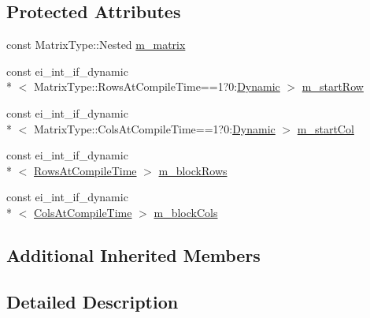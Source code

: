 \subsection*{Protected Attributes}
\begin{DoxyCompactItemize}
\item 
const Matrix\-Type\-::\-Nested \hyperlink{class_block_3_01_matrix_type_00_01_block_rows_00_01_block_cols_00_01_packet_access_00_01_is_sparse_01_4_a4a32807f94aefd0d12d8e28e619dd3e8}{m\-\_\-matrix}
\item 
const ei\-\_\-int\-\_\-if\-\_\-dynamic\\*
$<$ Matrix\-Type\-::\-Rows\-At\-Compile\-Time==1?0\-:\hyperlink{_constants_8h_adc9da5be31bdce40c25a92c27999c0e3}{Dynamic} $>$ \hyperlink{class_block_3_01_matrix_type_00_01_block_rows_00_01_block_cols_00_01_packet_access_00_01_is_sparse_01_4_abe05988121d3fe7a31b2634f25802976}{m\-\_\-start\-Row}
\item 
const ei\-\_\-int\-\_\-if\-\_\-dynamic\\*
$<$ Matrix\-Type\-::\-Cols\-At\-Compile\-Time==1?0\-:\hyperlink{_constants_8h_adc9da5be31bdce40c25a92c27999c0e3}{Dynamic} $>$ \hyperlink{class_block_3_01_matrix_type_00_01_block_rows_00_01_block_cols_00_01_packet_access_00_01_is_sparse_01_4_ad2ba05e47f339d5c74d6e46cbd089e22}{m\-\_\-start\-Col}
\item 
const ei\-\_\-int\-\_\-if\-\_\-dynamic\\*
$<$ \hyperlink{class_sparse_matrix_base_af601f771c204b3ca254a52085525004ca6f1c32affc05e36001dd1643129f15a9}{Rows\-At\-Compile\-Time} $>$ \hyperlink{class_block_3_01_matrix_type_00_01_block_rows_00_01_block_cols_00_01_packet_access_00_01_is_sparse_01_4_a7c5ff9c106b46ca33a056bf6af597df1}{m\-\_\-block\-Rows}
\item 
const ei\-\_\-int\-\_\-if\-\_\-dynamic\\*
$<$ \hyperlink{class_sparse_matrix_base_af601f771c204b3ca254a52085525004ca121f168f43ca4df38f99335271cad6e4}{Cols\-At\-Compile\-Time} $>$ \hyperlink{class_block_3_01_matrix_type_00_01_block_rows_00_01_block_cols_00_01_packet_access_00_01_is_sparse_01_4_a866f0ab333360219bc705caa933efe9c}{m\-\_\-block\-Cols}
\end{DoxyCompactItemize}
\subsection*{Additional Inherited Members}


\subsection{Detailed Description}
